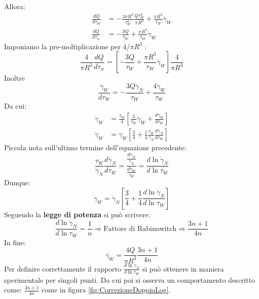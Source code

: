 Allora:
\begin{equation}
\begin{split}
\frac{dQ}{d\tau_W} &= - \frac{3\pi R^3}{\tau_W^4} \frac{Q \tau_W^3}{\pi R^3} + \frac{\pi R^3}{\tau_W}\dot{\gamma}_W\\
\frac{dQ}{d\tau_w} &= -\frac{3Q}{\tau_W} + \frac{\pi R^3}{\tau_W}\dot{\gamma}_W
\end{split}
\end{equation}
Imponiamo la pre-moltiplicazione per $4/\pi R^3$ :
\begin{equation}
\frac{4}{\pi R^3}\frac{dQ}{d\tau_w} = \left[-\frac{3Q}{\tau_W}+\frac{\pi R^3}{\tau_W}\dot{\gamma}_W\right]\frac{4}{\pi R^3}
\end{equation}
Inoltre
\begin{equation}
\frac{\dot{\gamma}_W}{d\tau_W} = -\frac{3 Q \dot{\gamma}_N}{\tau_W} + \frac{4 \dot{\gamma}_W}{\tau_W}
\end{equation}
Da cui:
\begin{equation}
\begin{split}
\dot{\gamma}_W &= \frac{\tau_W}{4}\left[\frac{3}{\tau_W}\dot{\gamma}_W + \frac{d\dot{\gamma}_W}{d\tau_W}\right]\\
\dot{\gamma}_W &= \gamma_W \left[\frac{3}{4} + \frac{1}{4}\frac{\tau_W}{\dot{\gamma}_N}\frac{d\dot{\gamma}_N}{d\tau_W}\right]
\end{split}
\end{equation}
Piccola nota sull'ultimo termine dell'equazione precedente:
\begin{equation}
\frac{\tau_W}{\dot{\gamma}_N} \frac{d\dot{\gamma}_N}{d\tau_W} = \frac{\frac{d\dot{\gamma}_N}{\dot{\gamma}_N}}{\frac{d\tau_W}{\tau_W}} = \frac{d \ln\dot{\gamma}_N}{d\ln\tau_W}
\end{equation}
Dunque:
\begin{equation}
\dot{\gamma}_W = \dot{\gamma}_N\left[\frac{3}{4} + \frac{1}{4} \frac{d \ln\dot{\gamma}_N}{d\ln\tau_W}\right]
\end{equation}
Seguendo la \textbf{legge di potenza} si può scrivere:
\begin{equation}
\frac{d \ln\dot{\gamma}_N}{d\ln\tau_W} = \frac{1}{n} \Rightarrow \text{Fattore di Rabinowitch} \Rightarrow \frac{3n+1}{4n}
\end{equation}
In fine:
\begin{equation}
\dot{\gamma_W} = \frac{4Q}{\pi R^3}\frac{3n+1}{4n}
\end{equation}
Per definire correttamente il rapporto $\frac{d \ln\dot{\gamma}_N}{d\ln\tau_W}$ si può ottenere in maniera sperimentale per singoli punti. Da cui poi si osserva un comportamento descritto come: $\frac{3n+1}{4n}$ come in figura \ref{fig:CorrezioneDoppioLog}.

